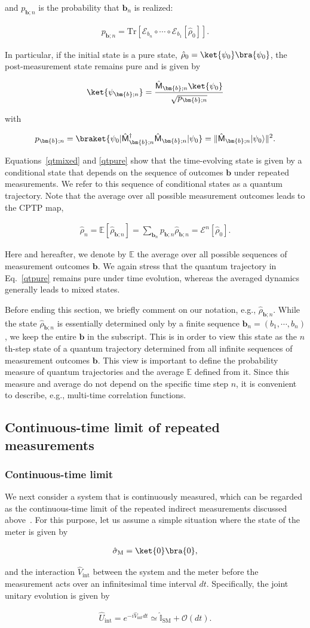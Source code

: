 \documentclass[preprint,pteplogo]{ptephy_v2}%
\numberwithin{equation}{section}
\theoremstyle{definition}
\newcommand{\ml}[1]{\mathcal{#1}}
\newcommand{\mr}[1]{\mathrm{#1}}
\newcommand{\mbb}[1]{\mathbb{#1}}
\newcommand{\aln}[1]{
\begin{align}
#1
\end{align}
}
\newcommand{\Tr}{\mr{Tr}}
\begin{document}
and $p_{\bm{b};n}$ is the probability that $\bm{b}_n$ is realized:
\aln{
p_{\bm{b};n}=\Tr[\ml{E}_{b_n}\circ\cdots \circ\ml{E}_{b_1}[\hat{\rho}_0]].
}
In particular, if the initial state is a pure state, $\hat{\rho}_0=\ket{\psi_0}\bra{\psi_0}$, the post-measurement state remains pure and is given by
\aln{\label{qtpure}
\ket{\psi_{\bm{b};n}}=\frac{\hat{\mathsf{M}}_{\bm{b};n}\ket{\psi_0}}{\sqrt{p_{\bm{b};n}}}
}
with 
\aln{
p_{\bm{b};n}=\braket{\psi_0|\hat{\mathsf{M}}_{\bm{b};n}^\dag\hat{\mathsf{M}}_{\bm{b};n}|\psi_0}
= \| \hat{\sf{M}}_{\bm{b};n} | \psi_0 \rangle \|^2.
}
Equations~\eqref{qtmixed} and \eqref{qtpure} show that the time-evolving state is given by a conditional state that depends on the sequence of outcomes $\bm{b}$ under repeated measurements.
We refer to this sequence of conditional states as a quantum trajectory.
Note that the average over all possible measurement outcomes leads to the CPTP map,
\aln{
\hat{\rho}_{n}=\mbb{E}[\hat{\rho}_{\bm{b};n}]=\sum_{\bm{b}_n}p_{\bm{b};n}\hat{\rho}_{\bm{b};n}=\ml{E}^n[\hat{\rho}_0].
}
Here and hereafter, we denote by $\mbb{E}$ the average over all possible sequences of measurement outcomes $\bm{b}$.
We again stress that the quantum trajectory in Eq.~\eqref{qtpure} remains pure under time evolution, whereas the averaged dynamics generally leads to mixed states.

Before ending this section, we briefly comment on our notation, e.g., $
\hat{\rho}_{\bm{b};n}$.
While the state $ \hat{\rho}_{\bm{b};n}$ is essentially determined only by a finite sequence $\bm{b}_n=(b_1,\cdots,b_n)$, we keep the entire $\bm{b}$ in the subscript. 
This is in order to view this state as the $n$th-step state of a quantum trajectory determined from all infinite sequences of measurement outcomes $\bm{b}$. 
This view is important to define the probability measure of quantum trajectories and the average $\mbb{E}$ defined from it. 
Since this measure and average do not depend on the specific time step $n$, it is convenient to describe, e.g., multi-time correlation functions.


\subsection{Continuous-time limit of repeated measurements}
\subsubsection{Continuous-time limit}
We next consider a system that is continuously measured, which can be regarded as the continuous-time limit of the repeated indirect measurements discussed above~\cite{pellegrini2008existence, pellegrini2010existence, pellegrini2010markov, wiseman2009quantum, landi2024current}.
For this purpose, let us assume a simple situation where the state of the meter is given by
\aln{
\hat{\sigma}_\mr{M}=\ket{0}\bra{0},
}
and the interaction $\hat{V}_\mathrm{int}$ between the system and the meter before the measurement acts over an infinitesimal time interval $dt$.
Specifically, the joint unitary evolution is given by
\aln{
\hat{U}_\mr{int}=e^{-i\hat{V}_\mathrm{int}dt}\simeq 
\mbb{\hat{I}}_\mr{SM}+\ml{O}(dt).
}
\end{document}
